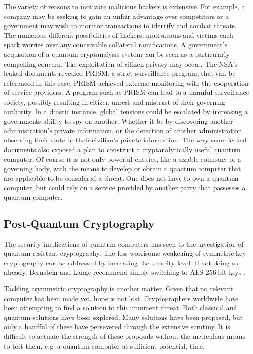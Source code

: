 The variety of reasons to motivate malicious hackers is extensive. For example, a company may be seeking to gain an unfair advantage over competitors or a government may wish to monitor transactions to identify and combat threats. The numerous different possibilities of hackers, motivations and victims each spark worries over any conceivable collateral ramifications. A government's acquisition of a quantum cryptanalysis system can be seen as a particularly compelling concern. The exploitation of citizen privacy may occur. The NSA's leaked documents \cite{Sec_Risk} revealed PRISM, a strict surveillance program, that can be referenced in this case. PRISM achieved extreme monitoring with the cooperation of service providers. A program such as PRISM can lead to a harmful surveillance society, possibly resulting in citizen unrest and mistrust of their governing authority. In a drastic instance, global tensions could be escalated by increasing a governments ability to spy on another. Whether it be by discovering another administration's private information, or the detection of another administration observing their state or their civilian's private information. The very same leaked documents also exposed a plan to construct a cryptanalytically useful quantum computer.
Of course it is not only powerful entities, like a sizable company or a governing body, with the means to develop or obtain a quantum computer that are applicable to be considered a threat. One does not have to own a quantum computer, but could rely on a service provided by another party that possesses a quantum computer. 

\subsection{Post-Quantum Cryptography}
The security implications of quantum computers has seen to the investigation of quantum resistant cryptography. The less worrisome weakening of symmetric key cryptography can be addressed by increasing the security level. If not doing so already, Bernstein and Lange recommend simply switching to AES 256-bit keys \cite{Post_Q_Cryptog}. 

Tackling asymmetric cryptography is another matter.
Given that no relevant computer has been made yet, hope is not lost. 
Cryptographers worldwide have been attempting to find a solution to this imminent threat. 
Both classical and quantum solutions have been explored. Many solutions have been proposed, but only a handful of these have persevered through the extensive scrutiny.
It is difficult to actuate the strength of these proposals without the meticulous means to test them, e.g. a quantum computer at sufficient potential, time. 

